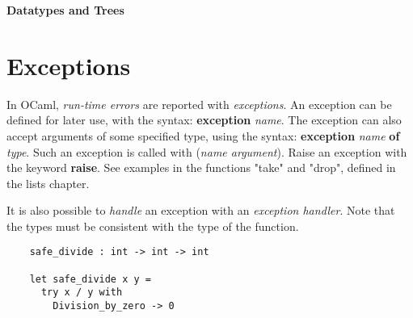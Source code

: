 \documentclass[12pt]{article}
\begin{document}
\begin{center}\LARGE\bf
    Datatypes and Trees
\end{center}

\section{Exceptions}
In OCaml, \textit{run-time errors} are reported with \textit{exceptions}. An exception can be defined
for later use, with the syntax: \textbf{exception} \textit{name}. The exception can also accept arguments
of some specified type, using the syntax: \textbf{exception} \textit{name} \textbf{of} \textit{type}.
Such an exception is called with (\textit{name argument}). Raise an exception with the keyword \textbf{raise}. See
examples in the functions "take" and "drop", defined in the lists chapter.

It is also possible to \textit{handle} an exception with an \textit{exception handler}. Note that the types must be
consistent with the type of the function.
\begin{lstlisting}
    safe_divide : int -> int -> int

    let safe_divide x y =
      try x / y with
        Division_by_zero -> 0
\end{lstlisting}
\end{document}

